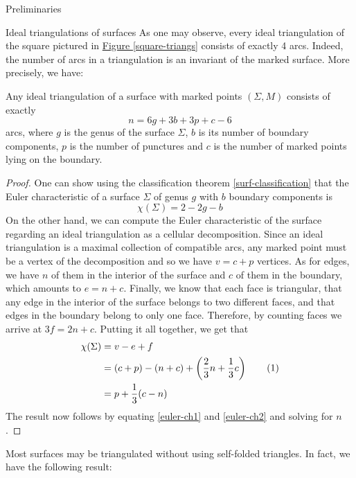 \begin{chapter}{Preliminaries}
\begin{section}{Ideal triangulations of surfaces}
As one may observe, every ideal triangulation of the square pictured in \hyperref[square-triangs]{Figure \ref*{square-triangs}} consists of exactly 4 arcs. Indeed, the number of arcs in a triangulation is an invariant of the marked surface. More precisely, we have:

\begin{prop} Any ideal triangulation of a surface with marked points $(\Sigma, M)$ consists of exactly
\[
n=6g+3b+3p+c-6
\]
arcs, where $g$ is the genus of the surface $\Sigma$, $b$ is its number of boundary components, $p$ is the number of punctures and $c$ is the number of marked points lying on the boundary.
\end{prop}
\begin{proof} One can show using the classification theorem \ref{surf-classification} that the Euler characteristic of a surface $\Sigma$ of genus $g$ with $b$ boundary components is
\begin{equation}\label{euler-ch1}
\chi(\Sigma)=2-2g-b
\end{equation}
On the other hand, we can compute the Euler characteristic of the surface regarding an ideal triangulation as a cellular decomposition. Since an ideal triangulation is a maximal collection of compatible arcs, any marked point must be a vertex of the decomposition and so we have $v = c + p$ vertices. As for edges, we have $n$ of them in the interior of the surface and $c$ of them in the boundary, which amounts to $e = n + c$. Finally, we know that each face is triangular, that any edge in the interior of the surface belongs to two different faces, and that edges in the boundary belong to only one face. Therefore, by counting faces we arrive at $3f = 2n+c$. Putting it all together, we get that
\begin{align*}\label{euler-ch2}
\chi(\Sigma)&=v-e+f\\
&=(c+p)-(n+c)+\left(\frac{2}{3}n+\frac{1}{3} c\right)\addtocounter{equation}{1}\tag{\theequation}\\
&=p+\frac{1}{3}(c-n)
\end{align*}
The result now follows by equating \eqref{euler-ch1} and \eqref{euler-ch2} and solving for $n$.
\end{proof}

Most surfaces may be triangulated without using self-folded triangles. In fact, we have the following result:


\end{section}
\end{chapter}
